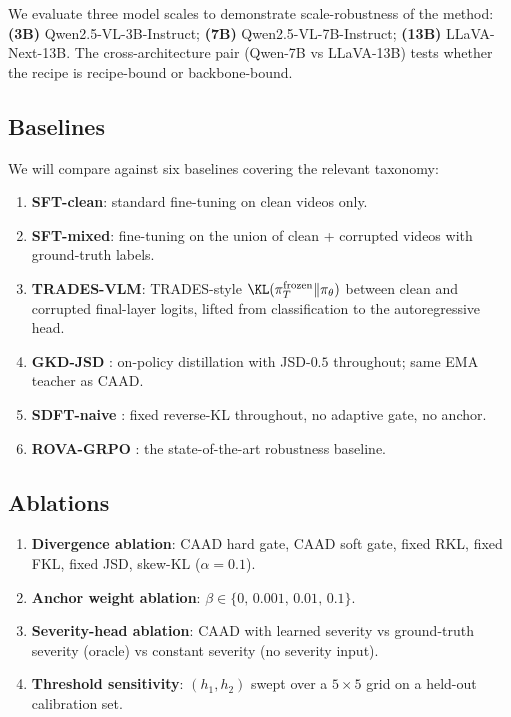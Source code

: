 \documentclass{article}
\newcommand{\teacher}{\pi_T}
\newcommand{\student}{\pi_\theta}
\newcommand{\caad}{\textsc{CAAD}}
\begin{document}
We evaluate three model scales to demonstrate scale-robustness of the method:
\textbf{(3B)} Qwen2.5-VL-3B-Instruct;
\textbf{(7B)} Qwen2.5-VL-7B-Instruct;
\textbf{(13B)} LLaVA-Next-13B.
The cross-architecture pair (Qwen-7B vs LLaVA-13B) tests whether the recipe is recipe-bound or backbone-bound.

\subsection{Baselines}

We will compare against six baselines covering the relevant taxonomy:

\begin{enumerate}[leftmargin=*,nosep]
\item \textbf{SFT-clean}: standard fine-tuning on clean videos only.
\item \textbf{SFT-mixed}: fine-tuning on the union of clean + corrupted videos with ground-truth labels.
\item \textbf{TRADES-VLM}: TRADES-style $\KL(\teacher^{\text{frozen}} \| \student)$ between clean and corrupted final-layer logits, lifted from classification to the autoregressive head.
\item \textbf{GKD-JSD} \citep{agarwal2024gkd}: on-policy distillation with JSD-$0.5$ throughout; same EMA teacher as \caad{}.
\item \textbf{SDFT-naive} \citep{shenfeld2026sdft}: fixed reverse-KL throughout, no adaptive gate, no anchor.
\item \textbf{ROVA-GRPO} \citep{he2026rova}: the state-of-the-art robustness baseline.
\end{enumerate}

\subsection{Ablations}

\begin{enumerate}[leftmargin=*,nosep]
\item \textbf{Divergence ablation}: \caad{} hard gate, \caad{} soft gate, fixed RKL, fixed FKL, fixed JSD, skew-KL ($\alpha = 0.1$).
\item \textbf{Anchor weight ablation}: $\beta \in \{0,\, 0.001,\, 0.01,\, 0.1\}$.
\item \textbf{Severity-head ablation}: \caad{} with learned severity vs ground-truth severity (oracle) vs constant severity (no severity input).
\item \textbf{Threshold sensitivity}: $(h_1, h_2)$ swept over a $5\!\times\!5$ grid on a held-out calibration set.
\end{enumerate}
\end{document}
